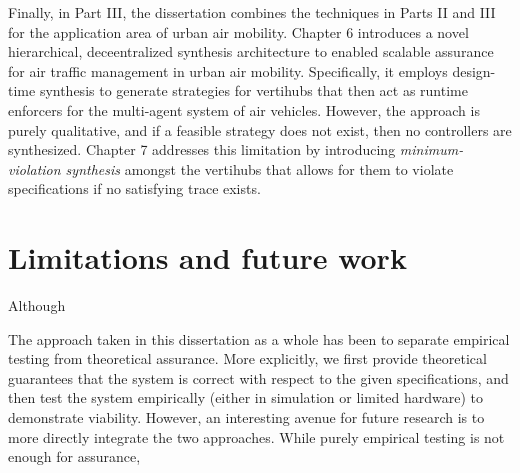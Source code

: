 Finally, in Part III, the dissertation combines the techniques in Parts II and III for the application area of urban air mobility. Chapter 6 introduces a novel hierarchical, deceentralized synthesis architecture to enabled scalable assurance for air traffic management in urban air mobility. Specifically, it employs design-time synthesis to generate strategies for vertihubs that then act as runtime enforcers for the multi-agent system of air vehicles. However, the approach is purely qualitative, and if a feasible strategy does not exist, then no controllers are synthesized. Chapter 7 addresses this limitation by introducing \emph{minimum-violation synthesis} amongst the vertihubs that allows for them to violate specifications if no satisfying trace exists. 

\section{Limitations and future work}
Although

The approach taken in this dissertation as a whole has been to separate empirical testing from theoretical assurance. More explicitly, we first provide theoretical guarantees that the system is correct with respect to the given specifications, and then test the system empirically (either in simulation or limited hardware) to demonstrate viability. However, an interesting avenue for future research is to more directly integrate the two approaches. While purely empirical testing is not enough for assurance, 